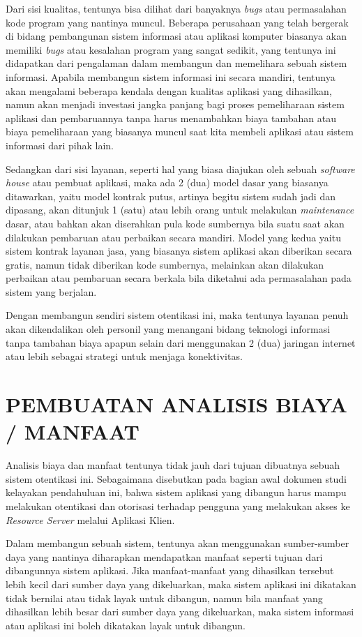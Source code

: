 \documentclass[pdftex,12pt, oneside]{article}
\begin{document}
Dari sisi kualitas, tentunya bisa dilihat dari banyaknya \textit{bugs} atau permasalahan kode program yang nantinya muncul. Beberapa perusahaan yang telah bergerak di bidang pembangunan sistem informasi atau aplikasi komputer biasanya akan memiliki \textit{bugs} atau kesalahan program yang sangat sedikit, yang tentunya ini didapatkan dari pengalaman dalam membangun dan memelihara sebuah sistem informasi. Apabila membangun sistem informasi ini secara mandiri, tentunya akan mengalami beberapa kendala dengan kualitas aplikasi yang dihasilkan, namun akan menjadi investasi jangka panjang bagi proses pemeliharaan sistem aplikasi dan pembaruannya tanpa harus menambahkan biaya tambahan atau biaya pemeliharaan yang biasanya muncul saat kita membeli aplikasi atau sistem informasi dari pihak lain.

Sedangkan dari sisi layanan, seperti hal yang biasa diajukan oleh sebuah \textit{software house} atau pembuat aplikasi, maka ada 2 (dua) model dasar yang biasanya ditawarkan, yaitu model kontrak putus, artinya begitu sistem sudah jadi dan dipasang, akan ditunjuk 1 (satu) atau lebih orang untuk melakukan \textit{maintenance} dasar, atau bahkan akan diserahkan pula kode sumbernya bila suatu saat akan dilakukan pembaruan atau perbaikan secara mandiri. Model yang kedua yaitu sistem kontrak layanan jasa, yang biasanya sistem aplikasi akan diberikan secara gratis, namun tidak diberikan kode sumbernya, melainkan akan dilakukan perbaikan atau pembaruan secara berkala bila diketahui ada permasalahan pada sistem yang berjalan. 

Dengan membangun sendiri sistem otentikasi ini, maka tentunya layanan penuh akan dikendalikan oleh personil yang menangani bidang teknologi informasi tanpa tambahan biaya apapun selain dari menggunakan 2 (dua) jaringan internet atau lebih sebagai strategi untuk menjaga konektivitas.

\section{PEMBUATAN ANALISIS BIAYA / MANFAAT}

Analisis biaya dan manfaat tentunya tidak jauh dari tujuan dibuatnya sebuah sistem otentikasi ini. Sebagaimana disebutkan pada bagian awal dokumen studi kelayakan pendahuluan ini, bahwa sistem aplikasi yang dibangun harus mampu melakukan otentikasi dan otorisasi terhadap pengguna yang melakukan akses ke \textit{Resource Server} melalui Aplikasi Klien.

Dalam membangun sebuah sistem, tentunya akan menggunakan sumber-sumber daya yang nantinya diharapkan mendapatkan manfaat seperti tujuan dari dibangunnya sistem aplikasi. Jika manfaat-manfaat yang dihasilkan tersebut lebih kecil dari sumber daya yang dikeluarkan, maka sistem aplikasi ini dikatakan tidak bernilai atau tidak layak untuk dibangun, namun bila manfaat yang dihasilkan lebih besar dari sumber daya yang dikeluarkan, maka sistem informasi atau aplikasi ini boleh dikatakan layak untuk dibangun.
\end{document}
